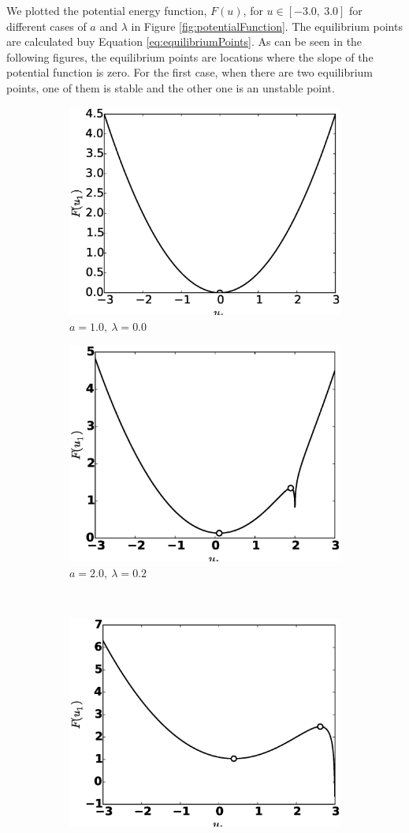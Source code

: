 \documentclass[14pt, a4paper]{extreport}
\begin{document}
%
We plotted the potential energy function, $F(u)$, for $u \in [-3.0,\ 3.0]$ for different cases of $a$ and $\lambda$ in Figure \ref{fig:potentialFunction}. The equilibrium points are calculated buy Equation \eqref{eq:equilibriumPoints}. As can be seen in the following figures, the equilibrium points are locations where the slope of the potential function is zero. For the first case, when there are two equilibrium points, one of them is stable and the other one is an unstable point.
%
\begin{figure}[H]
	\centering
	\begin{subfigure}[h]{8.0 cm}
		\includegraphics[width=8.0 cm]{figure/a10_lambda0.eps}
		\caption{$a=1.0,\ \lambda = 0.0$}
	\end{subfigure}
	\begin{subfigure}[h]{8.0 cm}
        \includegraphics[width=8.0 cm]{figure/a20_lambda2.eps}
		\caption{$a=2.0,\ \lambda = 0.2$}
    \end{subfigure}
    \\
    \begin{subfigure}[h]{8.0 cm}
		\includegraphics[width=8.0 cm]{figure/a30_lambda10.eps}

\end{subfigure}
\end{figure}
\end{document}
